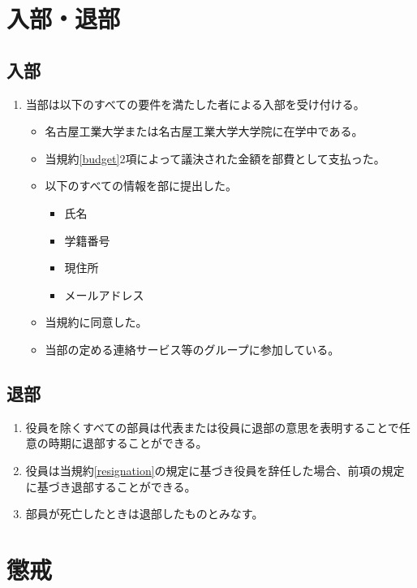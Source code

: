\documentclass[12pt, unicode, a4paper]{ltjsreport}
\begin{document}
\chapter{入部・退部}
    \section{入部}
        \begin{enumerate}
            \item 当部は以下のすべての要件を満たした者による入部を受け付ける。
            \begin{itemize}
                \item 名古屋工業大学または名古屋工業大学大学院に在学中である。
                \item 当規約\ref{budget}2項によって議決された金額を部費として支払った。
                \item 以下のすべての情報を部に提出した。
                \begin{itemize}
                    \item 氏名
                    \item 学籍番号
                    \item 現住所
                    \item メールアドレス
                \end{itemize}
                \item 当規約に同意した。
                \item 当部の定める連絡サービス等のグループに参加している。
            \end{itemize}
        \end{enumerate}

    \section{退部}
        \begin{enumerate}
            \item 役員を除くすべての部員は代表または役員に退部の意思を表明することで任意の時期に退部することができる。
            \item 役員は当規約\ref{resignation}の規定に基づき役員を辞任した場合、前項の規定に基づき退部することができる。
            \item 部員が死亡したときは退部したものとみなす。
        \end{enumerate}


\chapter{懲戒}
\end{document}
